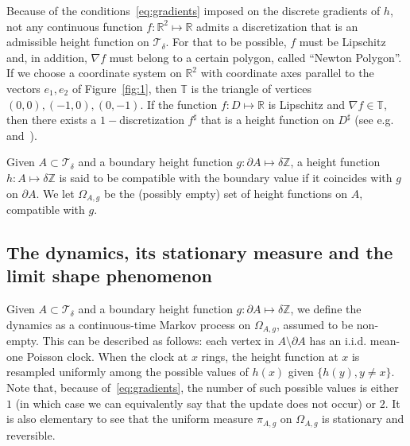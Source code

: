 \documentclass[AHL,Unicode,longabstracts,published]{cedram}
\newcommand{\R}{\mathbb{R}}
\newcommand{\Z}{\mathbb{Z}}
\newcommand{\bbT}{\mathbb{T}}
\newcommand{\clT}{\mathcal{T}}
\renewcommand{\d}{{\sharp }}
\begin{document}
\begin{rema}[The Newton Polygon $\bbT$]Because of the conditions~\eqref{eq:gradients} imposed on the discrete gradients of $h$, not any continuous function $f:\R^2\mapsto \R$ admits a discretization
that is an admissible height function on $\clT_\delta$. For that to be possible, $f$ must be Lipschitz and, in addition, $\nabla f$ must belong to a certain polygon, called ``Newton Polygon''. If we choose a coordinate system on $\R^2$ with coordinate axes parallel to the vectors $e_1,e_2$ of Figure~\ref{fig:1}, then $\bbT$ is the triangle of vertices $(0,0),(-1,0),(0,-1)$. If the function $f:D\mapsto \R$ is Lipschitz and $\nabla f\in \bbT$, then there exists a $1-$discretization $f^\d$ that is a height function on $D^\d$ (see e.g.~\cite[Sec.~2.1]{LT_cmp} and~\cite[Sec.~2.5.4]{LT_ptrf}). \label{rem:T}
\end{rema}



Given $A\subset \clT_\delta$ and a boundary height function $g:\partial A\mapsto \delta\Z$, a height function $h:A\mapsto \delta \Z$ is said to be compatible with the boundary value if it coincides with $g$ on $\partial A$. We let $\Omega_{A,g}$ be the (possibly empty) set of height functions on $A$, compatible with $g$.


\subsection{The dynamics, its stationary measure and the limit shape phenomenon}

Given $A\subset \clT_\delta$ and a boundary height function $g:\partial A\mapsto \delta\Z$, we define the dynamics as a continuous-time Markov process on $\Omega_{A,g}$, assumed to be non-empty. This can be described as follows: each vertex in $A\setminus \partial A$ has an i.i.d. mean-one Poisson clock. When the clock at $x$ rings, the height function at $x$ is resampled uniformly among the possible values of $h(x)$ given $\{h(y),y\ne x\}$. Note that, because of~\eqref{eq:gradients}, the number of such possible values is either $1$ (in which case we can equivalently say that the update does not occur) or $2$. It is also elementary to see that the uniform measure $\pi_{A,g}$ on $\Omega_{A,g}$ is stationary and reversible.
\end{document}
